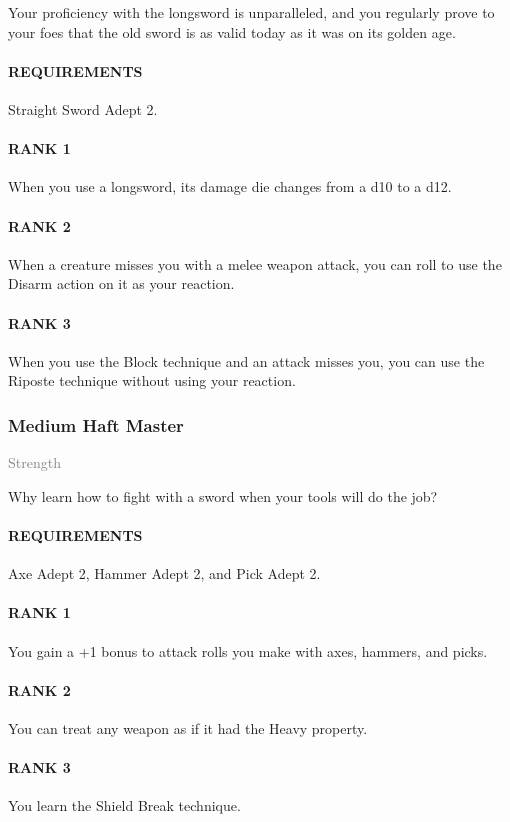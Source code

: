 \normalsize
Your proficiency with the longsword is unparalleled, and you regularly prove to your foes that the old sword is as valid today as it was on its golden age.
\paragraph{REQUIREMENTS} Straight Sword Adept 2.
\paragraph{RANK 1} When you use a longsword, its damage die changes from a d10 to a d12.
\paragraph{RANK 2} When a creature misses you with a melee weapon attack, you can roll to use the Disarm action on it as your reaction.
\paragraph{RANK 3} When you use the Block technique and an attack misses you, you can use the Riposte technique without using your reaction.

\subsubsection{Medium Haft Master} \label{feat::mediumhaftmaster}
\small{\textcolor{gray}{Strength}}

\normalsize
Why learn how to fight with a sword when your tools will do the job?
\paragraph{REQUIREMENTS} Axe Adept 2, Hammer Adept 2, and Pick Adept 2.
\paragraph{RANK 1} You gain a +1 bonus to attack rolls you make with axes, hammers, and picks.
\paragraph{RANK 2} You can treat any weapon as if it had the Heavy property.
\paragraph{RANK 3} You learn the Shield Break technique.

